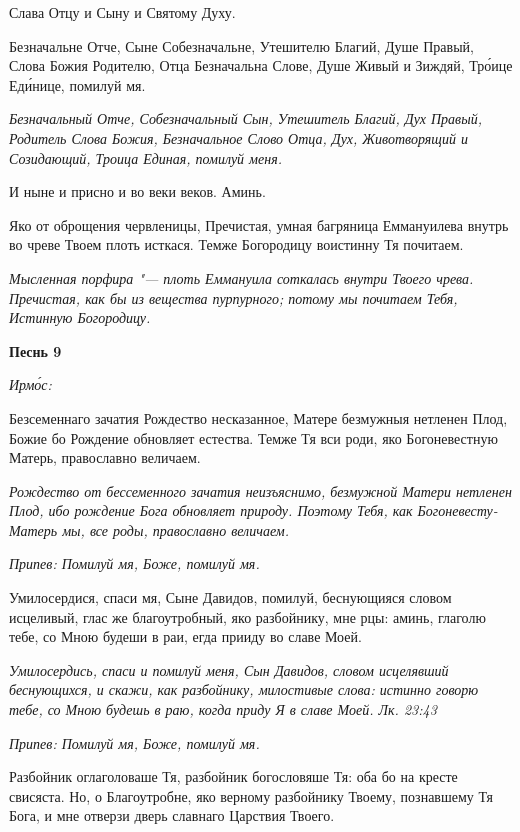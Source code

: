 Слава Отцу и Сыну и Святому Духу.


Безначальне Отче, Сыне Собезначальне, Утешителю Благий, Душе Правый, Слова Божия Родителю, Отца Безначальна Слове, Душе Живый и Зиждяй, Тро́ице Еди́нице, помилуй мя.


\itshape Безначальный Отче, Собезначальный Сын, Утешитель Благий, Дух Правый, Родитель Слова Божия, Безначальное Слово Отца, Дух, Животворящий и Созидающий, Троица Единая, помилуй меня.\normalfont{}


И ныне и присно и во веки веков. Аминь.


Яко от оброщения червленицы, Пречистая, умная багряница Еммануилева внутрь во чреве Твоем плоть исткася. Темже Богородицу воистинну Тя почитаем.


\itshape Мысленная порфира "--- плоть Еммануила соткалась внутри Твоего чрева. Пречистая, как бы из вещества пурпурного; потому мы почитаем Тебя, Истинную Богородицу.\normalfont{}





\bfseries Песнь 9\normalfont{}


\itshape Ирмо́с:\normalfont{}


Безсеменнаго зачатия Рождество несказанное, Матере безмужныя нетленен Плод, Божие бо Рождение обновляет естества. Темже Тя вси роди, яко Богоневестную Матерь, православно величаем.


\itshape Рождество от бессеменного зачатия неизъяснимо, безмужной Матери нетленен Плод, ибо рождение Бога обновляет природу. Поэтому Тебя, как Богоневесту-Матерь мы, все роды, православно величаем.\normalfont{}


\itshape Припев:\normalfont{} Помилуй мя, Боже, помилуй мя.


Умилосердися, спаси мя, Сыне Давидов, помилуй, беснующияся словом исцеливый, глас же благоутробный, яко разбойнику, мне рцы: аминь, глаголю тебе, со Мною будеши в раи, егда прииду во славе Моей.


\itshape Умилосердись, спаси и помилуй меня, Сын Давидов, словом исцелявший беснующихся, и скажи, как разбойнику, милостивые слова: истинно говорю тебе, со Мною будешь в раю, когда приду Я в славе Моей. Лк. 23:43\normalfont{}


\itshape Припев:\normalfont{} Помилуй мя, Боже, помилуй мя.


Разбойник оглаголоваше Тя, разбойник богословяше Тя: оба бо на кресте свисяста. Но, о Благоутробне, яко верному разбойнику Твоему, познавшему Тя Бога, и мне отверзи дверь славнаго Царствия Твоего.


